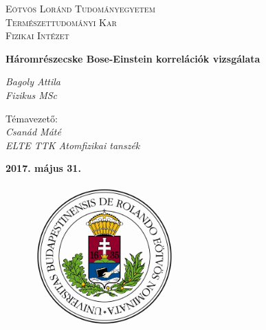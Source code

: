 \documentclass[11pt,a4paper]{article}
\title{}
\numberwithin{equation}{subsection}
\numberwithin{figure}{section}
\begin{document}
\pagestyle{empty}


\begin{titlepage}

\center

\textsc{\LARGE  Eötvös Loránd Tudományegyetem}\\[0.5cm]
\textsc{\LARGE Természettudományi Kar}\\[0.5cm]
\textsc{\LARGE Fizikai Intézet}\\[1.5cm]
\vspace{7mm}

{ \huge \bfseries Háromrészecske Bose-Einstein korrelációk vizsgálata}\\[0.4cm] %
\vspace{7mm}

\begin{center}
\LARGE \textit{Bagoly Attila}\\
\Large \textit{Fizikus MSc}\\
\end{center}

\begin{center}
\LARGE Témavezető: \\
\LARGE \textit{Csanád Máté}\\
\Large \textit{ELTE TTK Atomfizikai tanszék}\\
\end{center}

\vspace{4mm}
\begin{Large}
\textbf{2017. május 31.}
\end{Large}
\vspace{2mm}

\begin{figure}[H] 
\centerline{ 
\includegraphics[height=5.5cm]{pic/ELTE_logo.png} 
} 
\end{figure}

\vspace{-4mm}



\end{titlepage}
\end{document}
